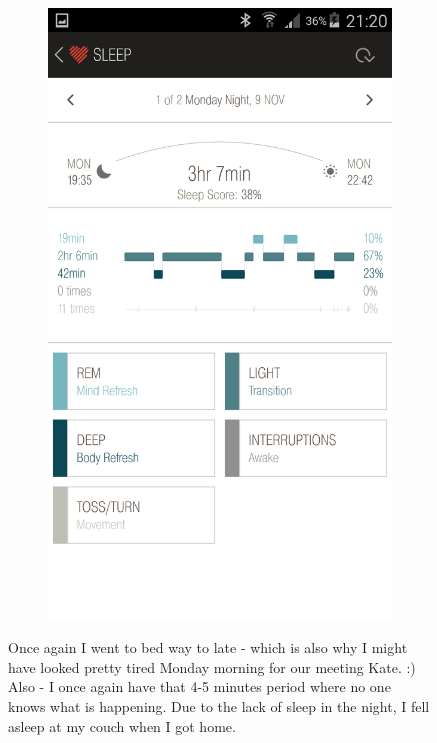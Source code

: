 \documentclass[12pt,a4paper]{article}
\begin{document}
\begin{figure}[H]
\begin{subfigure}[b]{0.5\textwidth}
        \includegraphics[width=\textwidth]{09-11-15-1.png}
    \end{subfigure}
\caption{Once again I went to bed way to late - which is also why I might have looked pretty tired Monday morning for our meeting Kate. :) Also - I once again have that 4-5 minutes period where no one knows what is happening. Due to the lack of sleep in the night, I fell asleep at my couch when I got home. }
\end{figure}
\end{document}
